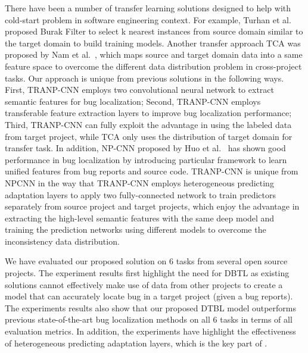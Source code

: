 
There have been a number of transfer learning solutions designed to help with cold-start problem in software engineering context. For example, Turhan et al.~\cite{TurhanMBS09} proposed Burak Filter to select  k nearest instances from source domain similar to the target domain to build training models. Another transfer approach TCA was proposed by Nam et al.~\cite{Nam2013transfer}, which maps source and target domain data into a same feature space to overcome the different data distribution problem in cross-project tasks. Our approach is unique from previous solutions in the following ways. First, TRANP-CNN employs two convolutional neural network to extract semantic features for bug localization; Second, TRANP-CNN employs transferable feature extraction layers to improve bug localization performance; Third, TRANP-CNN can fully exploit the advantage in using the labeled data from target project, while TCA only uses the distribution of target domain for transfer task. In addition, NP-CNN proposed by Huo et al.~\cite{huo2016learning} has shown good performance in bug localization by introducing particular framework to learn unified features from bug reports and source code. TRANP-CNN is unique from NPCNN in the way that TRANP-CNN employs heterogeneous predicting adaptation layers to apply two fully-connected network to train predictors separately from source project and target projects, which enjoy the advantage in extracting the high-level semantic features with the same deep model and training the prediction networks using different models to overcome the inconsistency data distribution. 

We have evaluated our proposed solution on 6 tasks from several open source projects. The experiment results first highlight the need for DBTL as existing solutions cannot effectively make use of data from other projects to create a model that can accurately locate bug in a target project (given a bug reports). The experiments results also show that our proposed DTBL model \TRANPCNN outperforms previous state-of-the-art bug localization methods on all 6 tasks in terms of all evaluation metrics. In addition, the experiments have highlight the effectiveness of heterogeneous predicting adaptation layers, which is the key part of \TRANPCNN.


